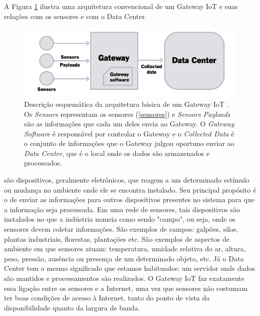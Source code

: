 A Figura \ref{fig:arquiteturaIotGateway} ilustra uma arquitetura convencional de um Gateway IoT e suas relações com os sensores e com o Data Center.
\begin{figure}[h!]
	\begin{center}
		\includegraphics[width=1\textwidth]{./img/rumFxS7.png}
		\caption{Descrição esquemática da arquitetura básica de um Gateway IoT \cite{DZone}. Os \textit{Sensors} representam os sensores (\ref{sensores}) e \textit{Sensors Payloads} são as informações que cada um deles envia ao Gateway. O \textit{Gateway Software} é responsável por controlar o Gateway e o \textit{Collected Data} é o conjunto de  informações que o Gateway julgou oportuno enviar ao \textit{Data Center}, que é o local onde os dados são armazenados e processados. }
		\label{fig:arquiteturaIotGateway}
	\end{center}
\end{figure}

\label{sensores} são dispositivos, geralmente eletrônicos, que reagem a um determinado estímulo ou mudança no ambiente onde ele se encontra instalado. Seu principal propósito é o de enviar as informações para outros dispositivos presentes no sistema para que a informação seja processada. Em uma rede de sensores, tais dispositivos são instalados no que a indústria nomeia como sendo "campo", ou seja, onde os sensores devem coletar informações. São exemplos de campos: galpões, silos, plantas industriais, florestas, plantações etc. São exemplos de aspectos de ambiente em que sensores atuam: temperatura, umidade relativa do ar, altura, peso, pressão, ausência ou presença de um determinado objeto, etc. Já o Data Center tem o mesmo significado que estamos habituados: um servidor onde dados são mantidos e processamentos são realizados. O Gateway IoT faz exatamente essa ligação entre os sensores e a Internet, uma vez que sensores não costumam ter boas condições de acesso à Internet, tanto do ponto de vista da disponibilidade quanto da largura de banda.

